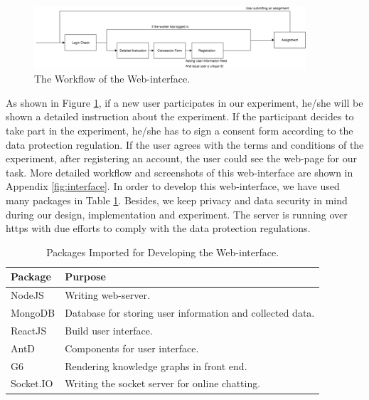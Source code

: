 \documentclass[bsc,frontabs,twoside,singlespacing,parskip,deptreport]{infthesis}     %
\begin{document}
\begin{figure}[h]
    \centering
    \includegraphics[width=0.9\textwidth]{process.png}
    \caption{The Workflow of the Web-interface.}
    \label{fig:web}
\end{figure}

As shown in Figure \ref{fig:web}, if a new user participates in our experiment, he/she will be shown a detailed instruction about the experiment. If the participant decides to take part in the experiment, he/she has to sign a consent form according to the data protection regulation. If the user agrees with the terms and conditions of the experiment, after registering an account, the user could see the web-page for our task. More detailed workflow and screenshots of this web-interface are shown in Appendix \ref{fig:interface}. In order to develop this web-interface, we have used many packages in Table \ref{tab:packages}. Besides, we keep privacy and data security in mind during our design, implementation and experiment. The server is running over https with due efforts to comply with the data protection regulations.

\begin{table}[]
\centering
\begin{tabular}{|l|l|}
\hline
Package                  & Purpose                                                   \\ \hline
NodeJS \cite{nodejs}      & Writing web-server.                                       \\ \hline
MongoDB \cite{monodb}     & Database for storing user information and collected data. \\ \hline
ReactJS \cite{react}      & Build user interface.                                    \\ \hline
AntD \cite{antd}           & Components for user interface.                  \\ \hline
G6 \cite{g6}              & Rendering knowledge graphs in front end.                   \\ \hline
Socket.IO \cite{socketio} & Writing the socket server for online chatting.                \\ \hline
\end{tabular}
\caption{Packages Imported for Developing the Web-interface.}
\label{tab:packages}
\end{table}
\end{document}
